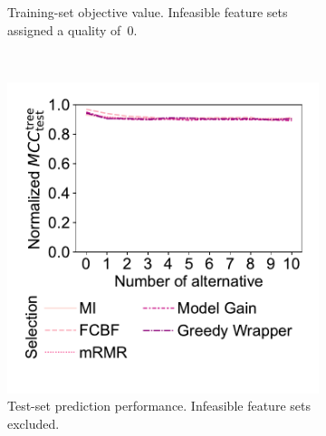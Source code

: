 \documentclass{article}
\theoremstyle{definition}
\begin{document}
\begin{figure}[p]
\begin{subfigure}[t]{0.48\textwidth}
		\caption{
			Training-set objective value.
			Infeasible feature sets assigned a quality of~0.
		}
		\label{fig:afs:impact-num-alternatives-fs-method-train-objective-max-fillna}
	\end{subfigure}
	\\ \vspace{\baselineskip}
	\begin{subfigure}[t]{0.48\textwidth}
		\centering
		\includegraphics[width=\textwidth, trim=20 40 15 15, clip]{plots/afs-impact-num-alternatives-fs-method-decision-tree-test-mcc-max.pdf}
		\caption{
			Test-set prediction performance.
			Infeasible feature sets excluded.
		}
		\label{fig:afs:impact-num-alternatives-fs-method-decision-tree-test-mcc-max}
	\end{subfigure}
	\hfill
	\begin{subfigure}[t]{0.48\textwidth}
		\centering

\end{subfigure}
\end{figure}
\end{document}
